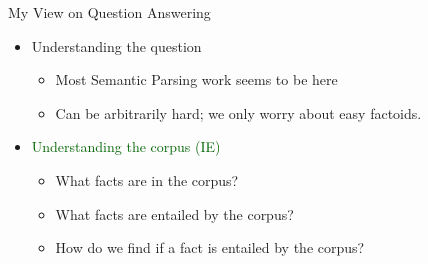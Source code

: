 
\begin{frame}{My View on Question Answering}
\begin{itemize}
  \itemsep 1em
  \item Understanding the question
  \begin{itemize}
    \itemsep 1em
    \item<2-> Most Semantic Parsing work seems to be here
    \item<2-> Can be arbitrarily hard; we only worry about easy factoids.
  \end{itemize}

  \item \textcolor<3->{darkgreen}{Understanding the corpus (IE)}
  \begin{itemize}
    \itemsep 1em
    \item<4-> What facts are in the corpus? 
      \cite{key:2014angeli-kbp,key:2014angeli-active}
    \item<5-> What facts are entailed by the corpus? 
    \item<6-> How do we find if a fact is entailed by the corpus?
      \cite{key:2013angeli-truth,key:2014angeli-naturalli}
  \end{itemize}
\end{itemize}
\end{frame}

